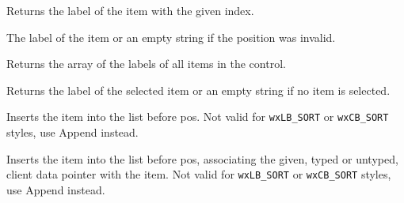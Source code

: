 
Returns the label of the item with the given index.




The label of the item or an empty string if the position was invalid.


\label{wxcontrolwithitemsgetstrings}


Returns the array of the labels of all items in the control.


\label{wxcontrolwithitemsgetstringselection}


Returns the label of the selected item or an empty string if no item is
selected.




\label{wxcontrolwithitemsinsert}


Inserts the item into the list before pos.
Not valid for {\tt wxLB\_SORT} or {\tt wxCB\_SORT} styles, use Append instead.



Inserts the item into the list before pos, associating the given, typed or
untyped, client data pointer with the item.
Not valid for {\tt wxLB\_SORT} or {\tt wxCB\_SORT} styles, use Append instead.




